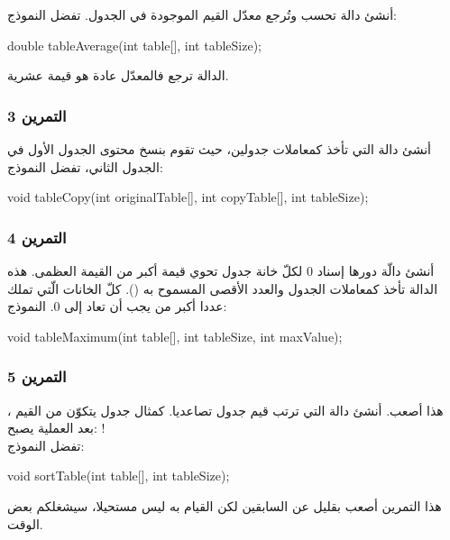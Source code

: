 أنشئ دالة
تحسب وتُرجع معدّل القيم الموجودة في الجدول. تفضل النموذج:

\begin{Csource}
double tableAverage(int table[], int tableSize);
\end{Csource}

الدالة ترجع
فالمعدّل عادة هو قيمة عشرية.

\subsubsection{التمرين 3}

أنشئ دالة
التي تأخذ كمعاملات جدولين، حيث تقوم بنسخ محتوى الجدول الأول في الجدول الثاني، تفضل النموذج:

\begin{Csource}
void tableCopy(int originalTable[], int copyTable[], int tableSize);
\end{Csource}

\subsubsection{التمرين 4}

أنشئ دالّة
دورها إسناد 0 لكلّ خانة جدول تحوي قيمة أكبر من القيمة العظمى. هذه الدالة تأخذ كمعاملات الجدول والعدد الأقصى المسموح به
().
كلّ الخانات الّتي تملك عددا أكبر من
يجب أن تعاد إلى 0. النموذج:

\begin{Csource}
void tableMaximum(int table[], int tableSize, int maxValue);
\end{Csource}

\subsubsection{التمرين 5}

هذا أصعب. أنشئ دالة
التي ترتب قيم جدول تصاعديا. كمثال جدول يتكوّن من القيم
،
بعد العملية يصبح:
!\\
تفضل النموذج:

\begin{Csource}
void sortTable(int table[], int tableSize);
\end{Csource}

هذا التمرين أصعب بقليل عن السابقين لكن القيام به ليس مستحيلا، سيشغلكم بعض الوقت.

